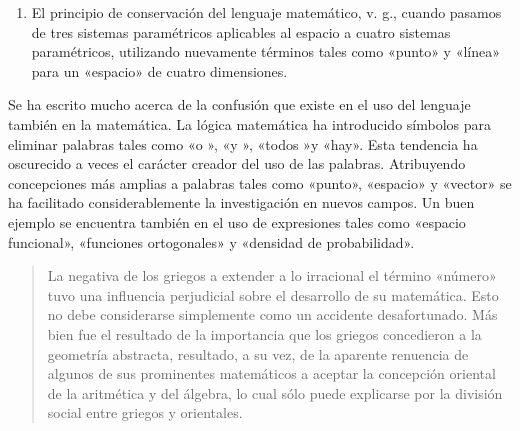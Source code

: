 \documentclass[a4paper, 12pt]{article}
\begin{document}
{{\begin{enumerate}
\begin{quote}\small Una aplicación especial de este principio fue la labor
realizada en geometría con elementos imaginarios, que condujo a Cayley y Klein
al descubrimiento de que la geometría métrica forma parte de la geometría
proyectiva, después de que Poncelet había derivado la segunda de la primera.

También podemos situar bajo este principio la concepción fundamental del
isomorfismo, que nos permite interpretar de diferentes maneras el mismo sistema
de relaciones formales entre elementos abstractos. De ello se tienen ejemplos en
la polaridad de la geometría proyectiva y en la prueba aportada por Hilbert
sobre el carácter no contradictorio de la geometría euclidiana aplicando ésta a
un álgebra lineal por medio de coordenadas. Aquí, la forma de un sistema
corresponde a una multiformidad de contenidos, y sólo recibe su vida del
contenido. \end{quote}

\item  El principio de conservación del lenguaje matemático, v. g., cuando
pasamos de tres sistemas paramétricos aplicables al espacio a cuatro sistemas
paramétricos, utilizando nuevamente términos tales como «punto» y «línea» para
un «espacio»  de cuatro dimensiones.

\end{enumerate}

Se ha escrito mucho acerca de la confusión que existe en el uso del lenguaje
también en la matemática. La lógica matemática ha introducido símbolos para
eliminar palabras tales como «o », «y », «todos »y «hay». Esta tendencia ha
oscurecido a veces el carácter creador del uso de las palabras. Atribuyendo
concepciones más amplias a palabras tales como «punto», «espacio»  y «vector»
se ha facilitado considerablemente la investigación en nuevos campos. Un buen
ejemplo se encuentra también en el uso de expresiones tales como «espacio
funcional», «funciones ortogonales» y «densidad de probabilidad».

\begin{quote}\small La negativa de los griegos a extender a lo irracional el
término «número» tuvo una influencia perjudicial sobre el desarrollo de su
matemática. Esto no debe considerarse simplemente como un accidente
desafortunado. Más bien fue el resultado de la importancia que los griegos
concedieron a la geometría abstracta, resultado, a su vez, de la aparente
renuencia de algunos de sus prominentes matemáticos a aceptar la concepción
oriental de la aritmética y del álgebra, lo cual sólo puede explicarse por la
división social entre griegos y orientales. \end{quote}

}}
\end{document}
